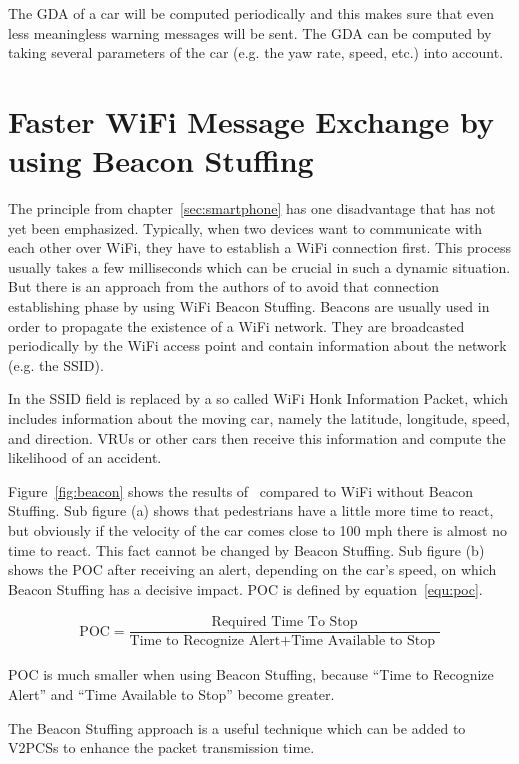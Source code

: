 \documentclass[]{ccs-thesis}
\begin{document}
The \ac{GDA} of a car will be computed periodically and this makes sure that even less meaningless warning messages will be sent. The \ac{GDA} can be computed by taking several parameters of the car (e.g. the yaw rate, speed, etc.) into account.

\section{Faster WiFi Message Exchange by using Beacon Stuffing}\label{sec:beacon}

The principle from chapter~\ref{sec:smartphone} has one disadvantage that has not yet been emphasized.
Typically, when two devices want to communicate with each other over WiFi, they have to establish a WiFi connection first. This process usually takes a few milliseconds which can be crucial in such a dynamic situation. But there is an approach from the authors of \cite{beacon} to avoid that connection establishing phase by using WiFi Beacon Stuffing. Beacons are usually used in order to propagate the existence of a WiFi network. They are broadcasted periodically by the WiFi access point and contain information about the network (e.g. the SSID).

In \cite{beacon} the SSID field is replaced by a so called WiFi Honk Information Packet, which includes information about the moving car, namely the latitude, longitude, speed, and direction. \acp{VRU} or other cars then receive this information and compute the likelihood of an accident.

Figure~\ref{fig:beacon} shows the results of~\cite{beacon} compared to WiFi without Beacon Stuffing. Sub figure (a) shows that pedestrians have a little more time to react, but obviously if the velocity of the car comes close to 100 mph there is almost no time to react. This fact cannot be changed by Beacon Stuffing. Sub figure (b) shows the \ac{POC} after receiving an alert, depending on the car's speed, on which Beacon Stuffing has a decisive impact. \ac{POC} is defined by equation~\ref{equ:poc}.

\begin{align}\label{equ:poc}
\text{POC}=\dfrac{\text{Required Time To Stop}}{\text{Time to Recognize Alert}+\text{Time Available to Stop }}
\end{align}

POC is much smaller when using Beacon Stuffing, because \enquote{Time to Recognize Alert} and \enquote{Time Available to Stop} become greater. 

The Beacon Stuffing approach is a useful technique which can be added to \acp{V2PCS} to enhance the packet transmission time.
\end{document}
